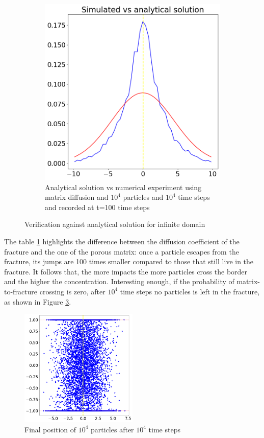 \documentclass{article}
\begin{document}
\begin{figure}[htbp]
\begin{subfigure}[b]{0.45\textwidth}
        \includegraphics[width=\textwidth]{images/verificationMatrixDiffusion.png}
        \caption{Analytical solution vs numerical experiment using matrix diffusion and $10^4$ particles and $10^4$ time steps and recorded at t=100 time steps}
        \label{fig:MatrixDiffusionVerification}
    \end{subfigure}
    \caption{Verification against analytical solution for infinite domain}
    \label{fig:MatrixDiffusion}
\end{figure}
The table \ref{fig:MatrixDiffusionVerification} highlights the difference between the diffusion coefficient of the fracture and the one of the porous matrix: once a particle escapes from the fracture, its jumps are 100 times smaller compared to those that still live in the fracture. It follows that, the more impacts the more particles cross the border and the higher the concentration. Interesting enough, if the probability of matrix-to-fracture crossing is zero, after $10^4$ time steps no particles is left in the fracture, as shown in Figure \ref{fig:finalPosMatrixDiff}.
\begin{figure}[h]
    \centering
    \includegraphics[width=0.5\textwidth]{images/finalPositionsMatrixDiffusion.png}
    \caption{Final position of $10^4$ particles after $10^4$ time steps}
    \label{fig:finalPosMatrixDiff}
\end{figure}
\end{document}
